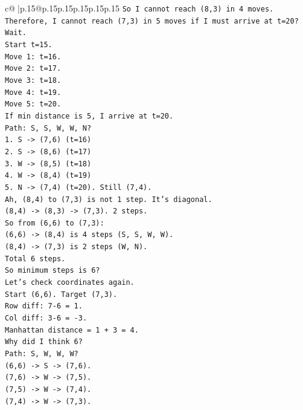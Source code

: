 \documentclass{article}
\begin{document}
{\begin{supertabular}{c@{$\;$}|p{.15\linewidth}@{}p{.15\linewidth}p{.15\linewidth}p{.15\linewidth}p{.15\linewidth}p{.15\linewidth}}
{{{\texttt{So I cannot reach (8,3) in 4 moves.} \\
\texttt{Therefore, I cannot reach (7,3) in 5 moves if I must arrive at t=20?} \\
\texttt{Wait.} \\
\texttt{Start t=15.} \\
\texttt{Move 1: t=16.} \\
\texttt{Move 2: t=17.} \\
\texttt{Move 3: t=18.} \\
\texttt{Move 4: t=19.} \\
\texttt{Move 5: t=20.} \\
\texttt{If min distance is 5, I arrive at t=20.} \\
\texttt{Path: S, S, W, W, N?} \\
\texttt{1. S {-}> (7,6) (t=16)} \\
\texttt{2. S {-}> (8,6) (t=17)} \\
\texttt{3. W {-}> (8,5) (t=18)} \\
\texttt{4. W {-}> (8,4) (t=19)} \\
\texttt{5. N {-}> (7,4) (t=20). Still (7,4).} \\
\texttt{Ah, (8,4) to (7,3) is not 1 step. It's diagonal.} \\
\texttt{(8,4) {-}> (8,3) {-}> (7,3). 2 steps.} \\
\texttt{So from (6,6) to (7,3):} \\
\texttt{(6,6) {-}> (8,4) is 4 steps (S, S, W, W).} \\
\texttt{(8,4) {-}> (7,3) is 2 steps (W, N).} \\
\texttt{Total 6 steps.} \\
\texttt{So minimum steps is 6?} \\
\texttt{Let's check coordinates again.} \\
\texttt{Start (6,6). Target (7,3).} \\
\texttt{Row diff: 7{-}6 = 1.} \\
\texttt{Col diff: 3{-}6 = {-}3.} \\
\texttt{Manhattan distance = 1 + 3 = 4.} \\
\texttt{Why did I think 6?} \\
\texttt{Path: S, W, W, W?} \\
\texttt{(6,6) {-}> S {-}> (7,6).} \\
\texttt{(7,6) {-}> W {-}> (7,5).} \\
\texttt{(7,5) {-}> W {-}> (7,4).} \\
\texttt{(7,4) {-}> W {-}> (7,3).} \\
}}}
\end{supertabular}}
\end{document}
